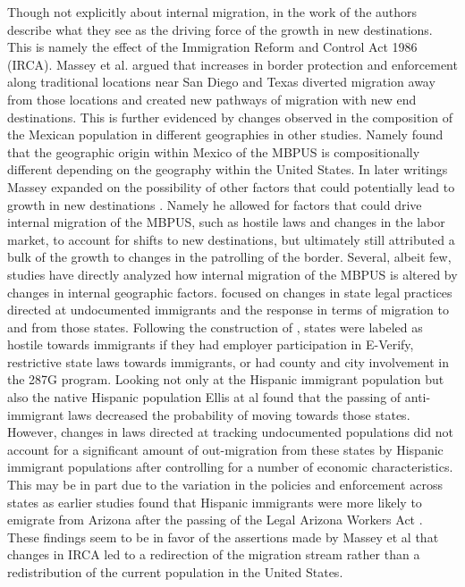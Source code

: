 \documentclass[fleqn,12pt]{olplainarticle}
\begin{document}
Though not explicitly about internal migration, in the work of \cite{Massey2002} the authors describe what they see as the driving force of the growth in new destinations.
This is namely the effect of the Immigration Reform and Control Act 1986 (IRCA).
Massey et al. argued that increases in border protection and enforcement along traditional locations near San Diego and Texas diverted migration away from those locations and created new pathways of migration with new end destinations.
This is further evidenced by changes observed in the composition of the Mexican population in different geographies in other studies.
Namely \citep{Riosmena2012} found that the geographic origin within Mexico of the MBPUS is compositionally different depending on the geography within the United States.
In later writings Massey expanded on the possibility of other factors that could potentially lead to growth in new destinations \citep{Massey2008}.
Namely he allowed for factors that could drive internal migration of the MBPUS, such as hostile laws and changes in the labor market, to account for shifts to new destinations, but ultimately still attributed a bulk of the growth to changes in the patrolling of the border.  
Several, albeit few, studies have directly analyzed how internal migration of the MBPUS is altered by changes in internal geographic factors.
\cite{Ellis2016} focused on changes in state legal practices directed at undocumented immigrants and the response in terms of migration to and from those states.
Following the construction of \cite{Leerkes2012}, states were labeled as hostile towards immigrants if they had employer participation in E-Verify, restrictive state laws towards immigrants, or had county and city involvement in the 287G program.
Looking not only at the Hispanic immigrant population but also the native Hispanic population Ellis at al found that the passing of anti-immigrant laws decreased the probability of moving towards those states.
However, changes in laws directed at tracking undocumented populations did not account for a significant amount of out-migration from these states by Hispanic immigrant populations after controlling for a number of economic characteristics.
This may be in part due to the variation in the policies and enforcement across states as earlier studies found that Hispanic immigrants were more likely to emigrate from Arizona after the passing of the Legal Arizona Workers Act \citep{Ellis2014a}.
These findings seem to be in favor of the assertions made by Massey et al that changes in IRCA led to a redirection of the migration stream rather than a redistribution of the current population in the United States.
\end{document}
